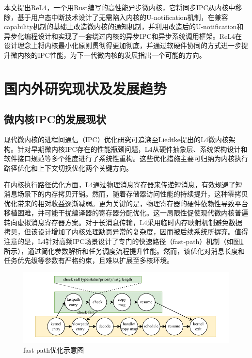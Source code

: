 本文提出ReL4，一个用Rust编写的高性能异步微内核，它将同步IPC从内核中移除，基于用户态中断技术设计了无需陷入内核的U-notification机制，在兼容capability机制的基础上改造微内核的通知机制，并利用改造后的U-notification和异步化编程设计和实现了一套绕过内核的异步IPC和异步系统调用框架。ReL4在设计理念上将内核最小化原则贯彻得更加彻底，并通过软硬件协同的方式进一步提升微内核的IPC性能，为下一代微内核的发展指出一个可能的方向。

\section{国内外研究现状及发展趋势}

\subsection{微内核IPC的发展现状}

现代微内核的进程间通信（IPC）优化研究可追溯至Liedtke提出的L4微内核架构。针对早期微内核IPC存在的性能瓶颈问题，L4从硬件抽象层、系统架构设计和软件接口规范等多个维度进行了系统性重构。这些优化措施主要可归纳为内核执行路径优化和上下文切换优化两个关键方向。

在内核执行路径优化方面，L4通过物理消息寄存器来传递短消息，有效规避了短消息场景下的内存拷贝开销。然而，随着存储器访问性能的持续提升，这种零拷贝优化带来的相对收益逐渐减弱。更为关键的是，物理寄存器的硬件依赖性导致平台移植困难，并可能干扰编译器的寄存器分配优化\cite{heiser2016l4}。这一局限性促使现代微内核普遍转向虚拟消息寄存器方案。对于长消息传输，L4采用临时内存映射机制避免数据拷贝，但该设计增加了内核处理缺页异常的复杂度\cite{heiser2016l4}，因而被后续系统所摒弃。值得注意的是，L4针对高频IPC场景设计了专门的快速路径（fast-path）机制\cite{peng2020fast}（如图\ref{fig:fast-path}所示），通过简化参数解析和任务调度流程提升性能。然而，该优化对消息长度和任务优先级等参数有严格约束，且难以扩展至多核环境。

\begin{figure}[htbp]
    \centering
    \includegraphics[width=1.0\textwidth]{figures/fast-path.drawio.pdf}
    \caption{fast-path优化示意图}\label{fig:fast-path}
\end{figure}

